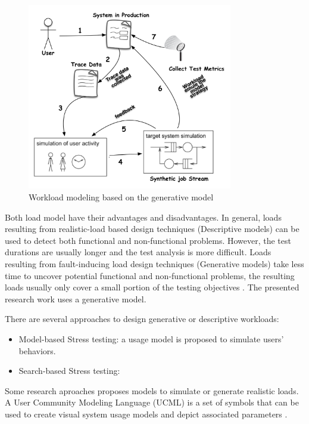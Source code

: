 \begin{figure}[!ht]
\centering
\includegraphics[width=0.8\textwidth]{./images/workloadmodel2300dpi.png}
\caption{Workload modeling based on the generative model \cite{DiLucca2006}}
\label{fig:generativemodel}

\end{figure}

Both load model have their advantages and disadvantages. In general, loads resulting from realistic-load based design techniques (Descriptive models) can be used to detect both functional and non-functional problems. However, the test durations are usually longer and the test analysis is more difficult. Loads resulting from fault-inducing load design techniques (Generative models) take less time to uncover potential functional and non-functional problems, the resulting loads usually only cover a small portion of the testing objectives \cite{Jiang2010}. The presented research work uses a generative model.


There are  several approaches to design generative or descriptive workloads:

\begin{itemize}
\item Model-based Stress testing: a usage model is proposed to simulate users’ behaviors.
\item Search-based Stress testing:
\end{itemize}

Some research aproaches proposes models to simulate or  generate realistic loads. A User Community Modeling Language (UCML) is a set of symbols that can be used to create visual system usage models and depict associated parameters \cite{Wang2013}.



